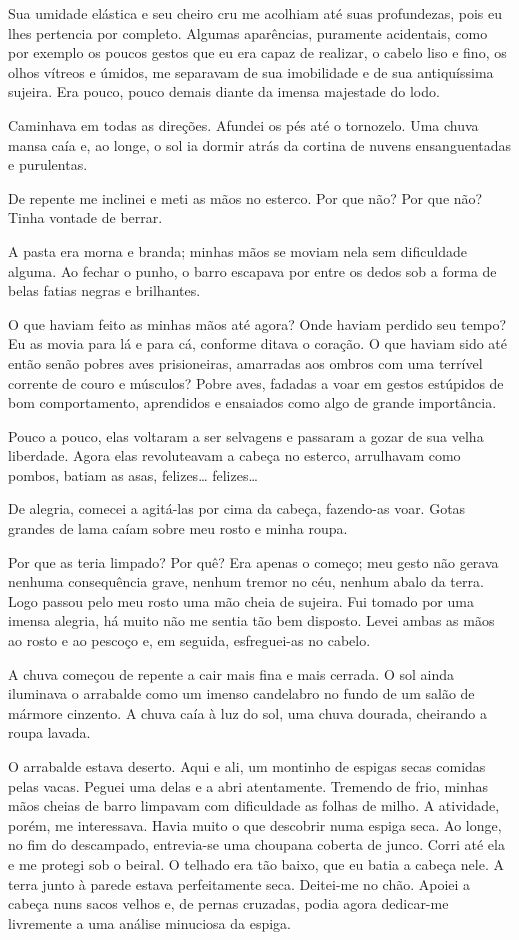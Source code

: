 Sua umidade elástica e seu cheiro cru me acolhiam até suas profundezas, pois eu lhes pertencia por completo. Algumas aparências, puramente acidentais, como por exemplo os poucos gestos que eu era capaz de realizar, o cabelo liso e fino, os olhos vítreos e úmidos, me separavam de sua imobilidade e de sua antiquíssima sujeira. Era pouco, pouco demais diante da imensa majestade do lodo.

Caminhava em todas as direções. Afundei os pés até o tornozelo. Uma chuva mansa caía e, ao longe, o sol ia dormir atrás da cortina de nuvens ensanguentadas e purulentas.

De repente me inclinei e meti as mãos no esterco. Por que não? Por que não? Tinha vontade de berrar.

A pasta era morna e branda; minhas mãos se moviam nela sem dificuldade alguma. Ao fechar o punho, o barro escapava por entre os dedos sob a forma de belas fatias negras e brilhantes.

O que haviam feito as minhas mãos até agora? Onde haviam perdido seu tempo? Eu as movia para lá e para cá, conforme ditava o coração. O que haviam sido até então senão pobres aves prisioneiras, amarradas aos ombros com uma terrível corrente de couro e músculos? Pobre aves, fadadas a voar em gestos estúpidos de bom comportamento, aprendidos e ensaiados como algo de grande importância.

Pouco a pouco, elas voltaram a ser selvagens e passaram a gozar de sua velha liberdade. Agora elas revoluteavam a cabeça no esterco, arrulhavam como pombos, batiam as asas, felizes\ldots{} felizes\ldots{}

De alegria, comecei a agitá-las por cima da cabeça, fazendo-as voar. Gotas grandes de lama caíam sobre meu rosto e minha roupa.

Por que as teria limpado? Por quê? Era apenas o começo; meu gesto não gerava nenhuma consequência grave, nenhum tremor no céu, nenhum abalo da terra. Logo passou pelo meu rosto uma mão cheia de sujeira. Fui tomado por uma imensa alegria, há muito não me sentia tão bem disposto. Levei ambas as mãos ao rosto e ao pescoço e, em seguida, esfreguei-as no cabelo. 

A chuva começou de repente a cair mais fina e mais cerrada. O sol ainda iluminava o arrabalde como um imenso candelabro no fundo de um salão de mármore cinzento. A chuva caía à luz do sol, uma chuva dourada, cheirando a roupa lavada.

O arrabalde estava deserto. Aqui e ali, um montinho de espigas secas comidas pelas vacas. Peguei uma delas e a abri atentamente. Tremendo de frio, minhas mãos cheias de barro limpavam com dificuldade as folhas de milho. A atividade, porém, me interessava. Havia muito o que descobrir numa espiga seca. Ao longe, no fim do descampado, entrevia-se uma choupana coberta de junco. Corri até ela e me protegi sob o beiral. O telhado era tão baixo, que eu batia a cabeça nele. A terra junto à parede estava perfeitamente seca. Deitei-me no chão. Apoiei a cabeça nuns sacos velhos e, de pernas cruzadas, podia agora dedicar-me livremente a uma análise minuciosa da espiga.

